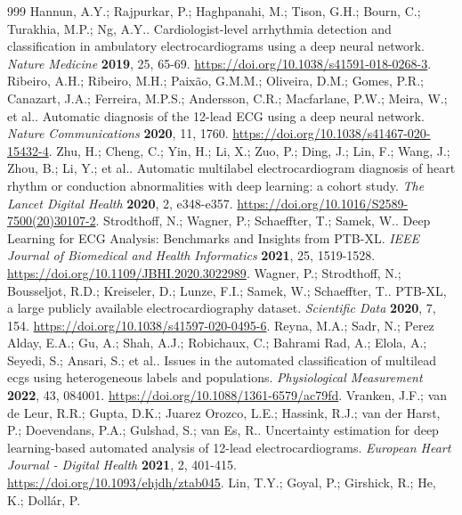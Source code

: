 \documentclass[life,article,submit,moreauthors]{Definitions/mdpi}
\begin{document}
\begin{thebibliography}{999}
\fontsize{9}{10.5}\selectfont
{}
Hannun, A.Y.; Rajpurkar, P.; Haghpanahi, M.; Tison, G.H.; Bourn, C.; Turakhia, M.P.; Ng, A.Y.. Cardiologist-level arrhythmia detection and classification in ambulatory electrocardiograms using a deep neural network. \emph{Nature Medicine} \textbf{2019}, 25, 65-69. \url{https://doi.org/10.1038/s41591-018-0268-3}.
Ribeiro, A.H.; Ribeiro, M.H.; Paixão, G.M.M.; Oliveira, D.M.; Gomes, P.R.; Canazart, J.A.; Ferreira, M.P.S.; Andersson, C.R.; Macfarlane, P.W.; Meira, W.; et al.. Automatic diagnosis of the 12-lead ECG using a deep neural network. \emph{Nature Communications} \textbf{2020}, 11, 1760. \url{https://doi.org/10.1038/s41467-020-15432-4}.
Zhu, H.; Cheng, C.; Yin, H.; Li, X.; Zuo, P.; Ding, J.; Lin, F.; Wang, J.; Zhou, B.; Li, Y.; et al.. Automatic multilabel electrocardiogram diagnosis of heart rhythm or conduction abnormalities with deep learning: a cohort study. \emph{The Lancet Digital Health} \textbf{2020}, 2, e348-e357. \url{https://doi.org/10.1016/S2589-7500(20)30107-2}.
Strodthoff, N.; Wagner, P.; Schaeffter, T.; Samek, W.. Deep Learning for ECG Analysis: Benchmarks and Insights from PTB-XL. \emph{IEEE Journal of Biomedical and Health Informatics} \textbf{2021}, 25, 1519-1528. \url{https://doi.org/10.1109/JBHI.2020.3022989}.
Wagner, P.; Strodthoff, N.; Bousseljot, R.D.; Kreiseler, D.; Lunze, F.I.; Samek, W.; Schaeffter, T.. PTB-XL, a large publicly available electrocardiography dataset. \emph{Scientific Data} \textbf{2020}, 7, 154. \url{https://doi.org/10.1038/s41597-020-0495-6}.
Reyna, M.A.; Sadr, N.; Perez Alday, E.A.; Gu, A.; Shah, A.J.; Robichaux, C.; Bahrami Rad, A.; Elola, A.; Seyedi, S.; Ansari, S.; et al.. Issues in the automated classification of multilead ecgs using heterogeneous labels and populations. \emph{Physiological Measurement} \textbf{2022}, 43, 084001. \url{https://doi.org/10.1088/1361-6579/ac79fd}.
Vranken, J.F.; van de Leur, R.R.; Gupta, D.K.; Juarez Orozco, L.E.; Hassink, R.J.; van der Harst, P.; Doevendans, P.A.; Gulshad, S.; van Es, R.. Uncertainty estimation for deep learning-based automated analysis of 12-lead electrocardiograms. \emph{European Heart Journal - Digital Health} \textbf{2021}, 2, 401-415. \url{https://doi.org/10.1093/ehjdh/ztab045}.
Lin, T.Y.; Goyal, P.; Girshick, R.; He, K.; Doll{\'a}r, P.

\end{thebibliography}
\end{document}
